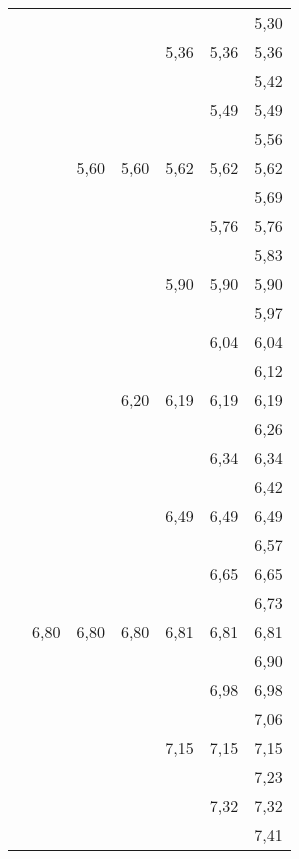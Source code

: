 \begin{tiny}
\begin{tabular}{@{}c@{ }c@{ }c@{ }c@{ }c@{ }c@{ }c}
     &      &      &      &      &      & 5,30 \\
     &      &      &      & 5,36 & 5,36 & 5,36 \\
     &      &      &      &      &      & 5,42 \\
     &      &      &      &      & 5,49 & 5,49 \\
     &      &      &      &      &      & 5,56 \\
     &      & 5,60 & 5,60 & 5,62 & 5,62 & 5,62 \\
     &      &      &      &      &      & 5,69 \\
     &      &      &      &      & 5,76 & 5,76 \\
     &      &      &      &      &      & 5,83 \\
     &      &      &      & 5,90 & 5,90 & 5,90 \\
     &      &      &      &      &      & 5,97 \\
     &      &      &      &      & 6,04 & 6,04 \\
     &      &      &      &      &      & 6,12 \\
     &      &      & 6,20 & 6,19 & 6,19 & 6,19 \\
     &      &      &      &      &      & 6,26 \\
     &      &      &      &      & 6,34 & 6,34 \\
     &      &      &      &      &      & 6,42 \\
     &      &      &      & 6,49 & 6,49 & 6,49 \\
     &      &      &      &      &      & 6,57 \\
     &      &      &      &      & 6,65 & 6,65 \\
     &      &      &      &      &      & 6,73 \\
     & 6,80 & 6,80 & 6,80 & 6,81 & 6,81 & 6,81 \\
     &      &      &      &      &      & 6,90 \\
     &      &      &      &      & 6,98 & 6,98 \\
     &      &      &      &      &      & 7,06 \\
     &      &      &      & 7,15 & 7,15 & 7,15 \\
     &      &      &      &      &      & 7,23 \\
     &      &      &      &      & 7,32 & 7,32 \\
     &      &      &      &      &      & 7,41 \\

\end{tabular}
\end{tiny}
